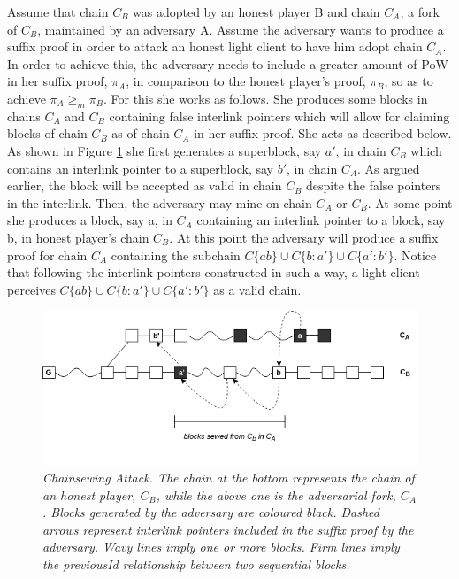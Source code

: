 \documentclass[9pt,a4paper]{article}
\begin{document}
Assume that chain $C_B$ was adopted by an honest player B and chain $C_A$, a fork of $C_B$, maintained by an adversary A. Assume the adversary wants to produce a suffix proof in order to attack an honest light client to have him adopt chain $C_A$. In order to achieve this, the adversary needs to include a greater amount of PoW in her suffix proof, $\pi_A$, in comparison to the honest player's proof, $\pi_B$, so as to achieve $\pi_A \geq_m \pi_B$. For this she works as follows. She produces some blocks in chains $C_A$ and $C_B$ containing false interlink pointers which will allow for claiming blocks of chain $C_B$ as of chain $C_A$ in her suffix proof. She acts as described below. 
As shown in Figure \ref{fig:attack} she first generates a superblock, say $a'$, in chain $C_B$ which contains an interlink pointer to a superblock, say $b'$, in chain $C_A$. As argued earlier, the block will be accepted as valid in chain $C_B$ despite the false pointers in the interlink.  Then, the adversary may mine on chain $C_A$ or $C_B$. At some point she produces a block, say a, in $C_A$ containing an interlink pointer to a block, say b, in honest player's chain $C_B$.
At this point the adversary will produce a suffix proof for chain $C_A$ containing the subchain $C\{ab\} \cup C\{b:a'\} \cup C\{a':b'\}$. Notice that following the interlink pointers constructed in such a way, a light client perceives $C\{ab\} \cup C\{b:a'\} \cup C\{a':b'\}$  as a valid chain.

\begin{figure}[h!]
	\begin{center}
		\includegraphics[scale=0.6]{figures/chainsewing_attack.png}
	\end{center}
	\caption{\textit{Chainsewing Attack. The chain at the bottom represents the chain of an honest player, $C_B$, while the above one is the adversarial fork, $C_A$. Blocks generated by the adversary are coloured black. Dashed arrows represent interlink pointers included in the suffix proof by the adversary. Wavy lines imply one or more blocks. Firm lines imply the previousId relationship between two sequential blocks.}}
	\label{fig:attack}
\end{figure}
\end{document}
